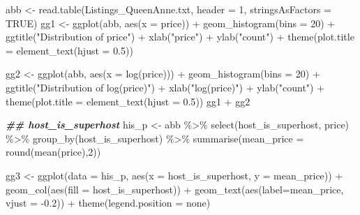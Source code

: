 \documentclass[
]{article}
\newenvironment{Shaded}{\begin{snugshade}}{\end{snugshade}}
\newcommand{\AttributeTok}[1]{\textcolor[rgb]{0.77,0.63,0.00}{#1}}
\newcommand{\ConstantTok}[1]{\textcolor[rgb]{0.00,0.00,0.00}{#1}}
\newcommand{\DecValTok}[1]{\textcolor[rgb]{0.00,0.00,0.81}{#1}}
\newcommand{\DocumentationTok}[1]{\textcolor[rgb]{0.56,0.35,0.01}{\textbf{\textit{#1}}}}
\newcommand{\FloatTok}[1]{\textcolor[rgb]{0.00,0.00,0.81}{#1}}
\newcommand{\FunctionTok}[1]{\textcolor[rgb]{0.00,0.00,0.00}{#1}}
\newcommand{\NormalTok}[1]{#1}
\newcommand{\OtherTok}[1]{\textcolor[rgb]{0.56,0.35,0.01}{#1}}
\newcommand{\SpecialCharTok}[1]{\textcolor[rgb]{0.00,0.00,0.00}{#1}}
\newcommand{\StringTok}[1]{\textcolor[rgb]{0.31,0.60,0.02}{#1}}
\begin{document}
\begin{Shaded}
\begin{Highlighting}[]
\NormalTok{abb }\OtherTok{\textless{}{-}} \FunctionTok{read.table}\NormalTok{(}\StringTok{\textquotesingle{}Listings\_QueenAnne.txt\textquotesingle{}}\NormalTok{, }\AttributeTok{header =} \DecValTok{1}\NormalTok{, }\AttributeTok{stringsAsFactors =} \ConstantTok{TRUE}\NormalTok{)}
\NormalTok{gg1 }\OtherTok{\textless{}{-}} \FunctionTok{ggplot}\NormalTok{(abb, }\FunctionTok{aes}\NormalTok{(}\AttributeTok{x =}\NormalTok{ price)) }\SpecialCharTok{+}
      \FunctionTok{geom\_histogram}\NormalTok{(}\AttributeTok{bins =} \DecValTok{20}\NormalTok{) }\SpecialCharTok{+}
      \FunctionTok{ggtitle}\NormalTok{(}\StringTok{"Distribution of price"}\NormalTok{) }\SpecialCharTok{+}
      \FunctionTok{xlab}\NormalTok{(}\StringTok{"price"}\NormalTok{) }\SpecialCharTok{+}
      \FunctionTok{ylab}\NormalTok{(}\StringTok{"count"}\NormalTok{) }\SpecialCharTok{+}
      \FunctionTok{theme}\NormalTok{(}\AttributeTok{plot.title =} \FunctionTok{element\_text}\NormalTok{(}\AttributeTok{hjust =} \FloatTok{0.5}\NormalTok{))}

\NormalTok{gg2 }\OtherTok{\textless{}{-}} \FunctionTok{ggplot}\NormalTok{(abb, }\FunctionTok{aes}\NormalTok{(}\AttributeTok{x =} \FunctionTok{log}\NormalTok{(price))) }\SpecialCharTok{+}
      \FunctionTok{geom\_histogram}\NormalTok{(}\AttributeTok{bins =} \DecValTok{20}\NormalTok{) }\SpecialCharTok{+}
      \FunctionTok{ggtitle}\NormalTok{(}\StringTok{"Distribution of log(price)"}\NormalTok{) }\SpecialCharTok{+}
      \FunctionTok{xlab}\NormalTok{(}\StringTok{"log(price)"}\NormalTok{) }\SpecialCharTok{+}
      \FunctionTok{ylab}\NormalTok{(}\StringTok{"count"}\NormalTok{) }\SpecialCharTok{+}
      \FunctionTok{theme}\NormalTok{(}\AttributeTok{plot.title =} \FunctionTok{element\_text}\NormalTok{(}\AttributeTok{hjust =} \FloatTok{0.5}\NormalTok{))}
\NormalTok{gg1 }\SpecialCharTok{+}\NormalTok{ gg2}

\DocumentationTok{\#\# host\_is\_superhost}
\NormalTok{his\_p }\OtherTok{\textless{}{-}}\NormalTok{ abb }\SpecialCharTok{\%\textgreater{}\%} \FunctionTok{select}\NormalTok{(host\_is\_superhost, price) }\SpecialCharTok{\%\textgreater{}\%} \FunctionTok{group\_by}\NormalTok{(host\_is\_superhost) }\SpecialCharTok{\%\textgreater{}\%} \FunctionTok{summarise}\NormalTok{(}\AttributeTok{mean\_price =} \FunctionTok{round}\NormalTok{(}\FunctionTok{mean}\NormalTok{(price),}\DecValTok{2}\NormalTok{))}

\NormalTok{gg3 }\OtherTok{\textless{}{-}} \FunctionTok{ggplot}\NormalTok{(}\AttributeTok{data =}\NormalTok{ his\_p, }\FunctionTok{aes}\NormalTok{(}\AttributeTok{x =}\NormalTok{ host\_is\_superhost, }\AttributeTok{y =}\NormalTok{ mean\_price)) }\SpecialCharTok{+}
          \FunctionTok{geom\_col}\NormalTok{(}\FunctionTok{aes}\NormalTok{(}\AttributeTok{fill =}\NormalTok{ host\_is\_superhost)) }\SpecialCharTok{+}
          \FunctionTok{geom\_text}\NormalTok{(}\FunctionTok{aes}\NormalTok{(}\AttributeTok{label=}\NormalTok{mean\_price, }\AttributeTok{vjust =} \SpecialCharTok{{-}}\FloatTok{0.2}\NormalTok{)) }\SpecialCharTok{+}
          \FunctionTok{theme}\NormalTok{(}\AttributeTok{legend.position =} \StringTok{\textquotesingle{}none\textquotesingle{}}\NormalTok{)}


\end{Highlighting}
\end{Shaded}
\end{document}
